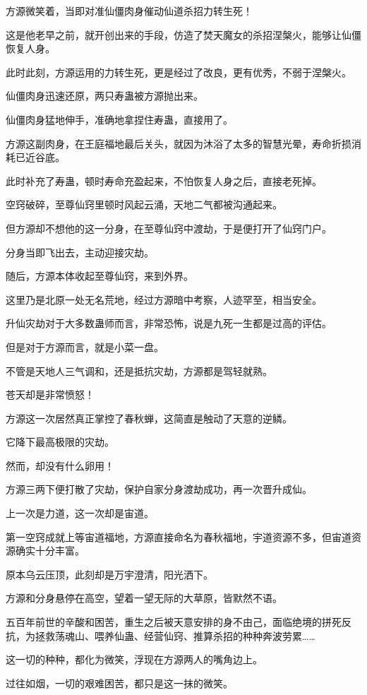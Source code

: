 \begin{this_body}
方源微笑着，当即对准仙僵肉身催动仙道杀招力转生死！

这是他老早之前，就开创出来的手段，仿造了焚天魔女的杀招涅槃火，能够让仙僵恢复人身。

此时此刻，方源运用的力转生死，更是经过了改良，更有优秀，不弱于涅槃火。

仙僵肉身迅速还原，两只寿蛊被方源抛出来。

仙僵肉身猛地伸手，准确地拿捏住寿蛊，直接用了。

方源这副肉身，在王庭福地最后关头，就因为沐浴了太多的智慧光晕，寿命折损消耗已近谷底。

此时补充了寿蛊，顿时寿命充盈起来，不怕恢复人身之后，直接老死掉。

空窍破碎，至尊仙窍里顿时风起云涌，天地二气都被沟通起来。

但方源却不想他的这一分身，在至尊仙窍中渡劫，于是便打开了仙窍门户。

分身当即飞出去，主动迎接灾劫。

随后，方源本体收起至尊仙窍，来到外界。

这里乃是北原一处无名荒地，经过方源暗中考察，人迹罕至，相当安全。

升仙灾劫对于大多数蛊师而言，非常恐怖，说是九死一生都是过高的评估。

但是对于方源而言，就是小菜一盘。

不管是天地人三气调和，还是抵抗灾劫，方源都是驾轻就熟。

苍天却是非常愤怒！

方源这一次居然真正掌控了春秋蝉，这简直是触动了天意的逆鳞。

它降下最高极限的灾劫。

然而，却没有什么卵用！

方源三两下便打散了灾劫，保护自家分身渡劫成功，再一次晋升成仙。

上一次是力道，这一次却是宙道。

第一空窍成就上等宙道福地，方源直接命名为春秋福地，宇道资源不多，但宙道资源确实十分丰富。

原本乌云压顶，此刻却是万宇澄清，阳光洒下。

方源和分身悬停在高空，望着一望无际的大草原，皆默然不语。

五百年前世的辛酸和困苦，重生之后被天意安排的身不由己，面临绝境的拼死反抗，为拯救荡魂山、喂养仙蛊、经营仙窍、推算杀招的种种奔波劳累……

这一切的种种，都化为微笑，浮现在方源两人的嘴角边上。

过往如烟，一切的艰难困苦，都只是这一抹的微笑。

\end{this_body}

